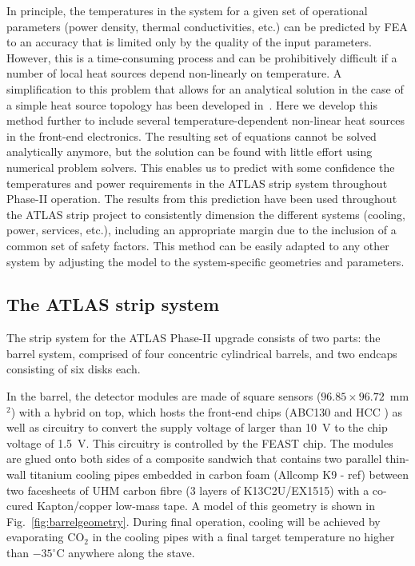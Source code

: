 In principle, the temperatures in the system for a given set of operational parameters (power density, thermal conductivities, etc.) can be predicted by FEA to an accuracy that is limited only by the quality of the input parameters. However, this is a time-consuming process and can be prohibitively difficult if a number of local heat sources depend non-linearly on temperature. A simplification to this problem that allows for an analytical solution in the case of a simple heat source topology has been developed in~\cite{Beck:2010zzd}. Here we develop this method further to include several temperature-dependent non-linear heat sources in the front-end electronics. The resulting set of equations cannot be solved analytically anymore, but the solution can be found with little effort using numerical problem solvers. This enables us to predict with some confidence the temperatures and power requirements in the ATLAS strip system throughout Phase-II operation. The results from this prediction have been used throughout the ATLAS strip project to consistently dimension the different systems (cooling, power, services, etc.), including an appropriate margin due to the inclusion of a common set of safety factors. This method can be easily adapted to any other system by adjusting the model to the system-specific geometries and parameters.

\subsection{The ATLAS strip system}
The strip system for the ATLAS Phase-II upgrade \cite{Collaboration:2017mtb} consists of two parts: the barrel system, comprised of four concentric cylindrical barrels, and two endcaps consisting of six disks each.

In the barrel, the detector modules are made of square sensors ($96.85\times 96.72$~mm$^2$) with a hybrid on top, which hosts the front-end chips (ABC130 \cite{abc130} and HCC \cite{Collaboration:2017mtb}) as well as circuitry to convert the supply voltage of larger than 10~V to the chip voltage of 1.5~V. This circuitry is controlled by the FEAST chip. The modules are glued onto both sides of a composite sandwich that contains two parallel thin-wall titanium cooling pipes embedded in carbon foam (Allcomp K9 - ref)  between two facesheets of UHM carbon fibre (3 layers of K13C2U/EX1515) with a co-cured Kapton/copper low-mass tape. A model of this geometry is shown in Fig.~\ref{fig:barrelgeometry}. During final operation, cooling will be achieved by evaporating CO$_2$ in the cooling pipes with a final target temperature no higher than $-35^\circ$C anywhere along the stave.

